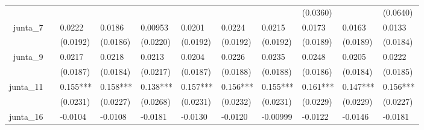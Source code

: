 \begin{tabular}{rrrrrrrrrrr}
      & \multicolumn{1}{l}{} & \multicolumn{1}{l}{} & \multicolumn{1}{l}{} & \multicolumn{1}{l}{} & \multicolumn{1}{l}{} & \multicolumn{1}{l}{} & \multicolumn{1}{l}{} & \multicolumn{1}{l}{(0.0360)} & \multicolumn{1}{l}{} & \multicolumn{1}{l}{(0.0640)} \\
junta\_7 & \multicolumn{1}{l}{} & \multicolumn{1}{l}{0.0222} & \multicolumn{1}{l}{0.0186} & \multicolumn{1}{l}{0.00953} & \multicolumn{1}{l}{0.0201} & \multicolumn{1}{l}{0.0224} & \multicolumn{1}{l}{0.0215} & \multicolumn{1}{l}{0.0173} & \multicolumn{1}{l}{0.0163} & \multicolumn{1}{l}{0.0133} \\
      & \multicolumn{1}{l}{} & \multicolumn{1}{l}{(0.0192)} & \multicolumn{1}{l}{(0.0186)} & \multicolumn{1}{l}{(0.0220)} & \multicolumn{1}{l}{(0.0192)} & \multicolumn{1}{l}{(0.0192)} & \multicolumn{1}{l}{(0.0192)} & \multicolumn{1}{l}{(0.0189)} & \multicolumn{1}{l}{(0.0189)} & \multicolumn{1}{l}{(0.0184)} \\
junta\_9 & \multicolumn{1}{l}{} & \multicolumn{1}{l}{0.0217} & \multicolumn{1}{l}{0.0218} & \multicolumn{1}{l}{0.0213} & \multicolumn{1}{l}{0.0204} & \multicolumn{1}{l}{0.0226} & \multicolumn{1}{l}{0.0235} & \multicolumn{1}{l}{0.0248} & \multicolumn{1}{l}{0.0205} & \multicolumn{1}{l}{0.0222} \\
      & \multicolumn{1}{l}{} & \multicolumn{1}{l}{(0.0187)} & \multicolumn{1}{l}{(0.0184)} & \multicolumn{1}{l}{(0.0217)} & \multicolumn{1}{l}{(0.0187)} & \multicolumn{1}{l}{(0.0188)} & \multicolumn{1}{l}{(0.0188)} & \multicolumn{1}{l}{(0.0186)} & \multicolumn{1}{l}{(0.0184)} & \multicolumn{1}{l}{(0.0185)} \\
junta\_11 & \multicolumn{1}{l}{} & \multicolumn{1}{l}{0.155***} & \multicolumn{1}{l}{0.158***} & \multicolumn{1}{l}{0.138***} & \multicolumn{1}{l}{0.157***} & \multicolumn{1}{l}{0.156***} & \multicolumn{1}{l}{0.155***} & \multicolumn{1}{l}{0.161***} & \multicolumn{1}{l}{0.147***} & \multicolumn{1}{l}{0.156***} \\
      & \multicolumn{1}{l}{} & \multicolumn{1}{l}{(0.0231)} & \multicolumn{1}{l}{(0.0227)} & \multicolumn{1}{l}{(0.0268)} & \multicolumn{1}{l}{(0.0231)} & \multicolumn{1}{l}{(0.0232)} & \multicolumn{1}{l}{(0.0231)} & \multicolumn{1}{l}{(0.0229)} & \multicolumn{1}{l}{(0.0229)} & \multicolumn{1}{l}{(0.0227)} \\
junta\_16 & \multicolumn{1}{l}{} & \multicolumn{1}{l}{-0.0104} & \multicolumn{1}{l}{-0.0108} & \multicolumn{1}{l}{-0.0181} & \multicolumn{1}{l}{-0.0130} & \multicolumn{1}{l}{-0.0120} & \multicolumn{1}{l}{-0.00999} & \multicolumn{1}{l}{-0.0122} & \multicolumn{1}{l}{-0.0146} & \multicolumn{1}{l}{-0.0181} \\

\end{tabular}
